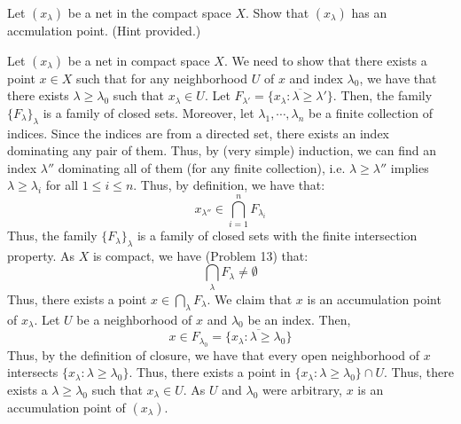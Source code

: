 \documentclass[12pt]{article}
\begin{document}
\begin{problem}{51}
    Let $(x_\lambda)$ be a net in the compact space $X$. Show that $(x_\lambda)$ has an accmulation point. (Hint provided.)
\end{problem}
\begin{solution}
    Let $(x_\lambda)$ be a net in compact space $X$. We need to show that there exists a point $x \in X$ such that for any neighborhood $U$ of $x$ and index $\lambda_0$, we have that there exists $\lambda \geq \lambda_0$ such that $x_{\lambda} \in U$. \bbni
    Let $F_{\lambda'} = \overline{\{x_\lambda: \lambda \geq \lambda'\}}$. Then, the family $\{F_\lambda\}_\lambda$ is a family of closed sets. Moreover, let $\lambda_1, \cdots, \lambda_n$ be a finite collection of indices. Since the indices are from a directed set, there exists an index dominating any pair of them. Thus, by (very simple) induction, we can find an index $\lambda''$ dominating all of them (for any finite collection), i.e. $\lambda \geq \lambda''$ implies $\lambda \geq \lambda_i$ for all $1 \leq i \leq n$. Thus, by definition, we have that: 
    \[ x_{\lambda''} \in \bigcap_{i=1}^n F_{\lambda_i}\]
    Thus, the family $\{F_\lambda\}_\lambda$ is a family of closed sets with the finite intersection property. As $X$ is compact, we have (Problem 13) that: 
    \[ \bigcap_{\lambda} F_\lambda \neq \emptyset\]
    Thus, there exists a point $x \in \bigcap_{\lambda} F_\lambda$. We claim that $x$ is an accumulation point of $x_\lambda$. \bbni
    Let $U$ be a neighborhood of $x$ and $\lambda_0$ be an index. Then,
    \[ x \in F_{\lambda_0} = \overline{\{x_\lambda: \lambda \geq \lambda_0 \}}\]
    Thus, by the definition of closure, we have that every open neighborhood of $x$ intersects $\{x_\lambda: \lambda \geq \lambda_0\}$. Thus, there exists a point in $\{x_\lambda: \lambda \geq \lambda_0\} \cap U$. Thus, there exists a $\lambda \geq \lambda_0$ such that $x_\lambda \in U$. \bbni 
    As $U$ and $\lambda_0$ were arbitrary, $x$ is an accumulation point of $(x_\lambda)$.
\end{solution}
\newpage
\end{document}

